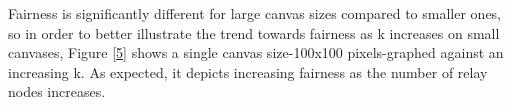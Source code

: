 Fairness is significantly different for large canvas sizes compared to smaller ones, so in order to better illustrate the trend towards fairness as k increases on small canvases, Figure \ref{5} shows a single canvas size-100x100 pixels-graphed against an increasing k.  As expected, it depicts increasing fairness as the number of relay nodes increases.

